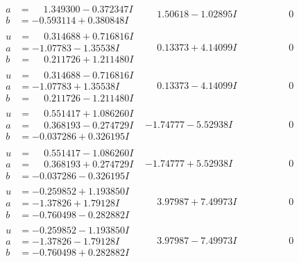 \documentclass[1p]{elsarticle_modified}
\theoremstyle{definition}
\begin{document}
$$\begin{array}{c|c|c}
\begin{aligned}
a &= \phantom{-}1.349300 - 0.372347 I \\
b &= -0.593114 + 0.380848 I\end{aligned}
 & \phantom{-}1.50618 - 1.02895 I & \phantom{-0.000000 } 0 \\ \hline\begin{aligned}
u &= \phantom{-}0.314688 + 0.716816 I \\
a &= -1.07783 - 1.35538 I \\
b &= \phantom{-}0.211726 + 1.211480 I\end{aligned}
 & \phantom{-}0.13373 + 4.14099 I & \phantom{-0.000000 } 0 \\ \hline\begin{aligned}
u &= \phantom{-}0.314688 - 0.716816 I \\
a &= -1.07783 + 1.35538 I \\
b &= \phantom{-}0.211726 - 1.211480 I\end{aligned}
 & \phantom{-}0.13373 - 4.14099 I & \phantom{-0.000000 } 0 \\ \hline\begin{aligned}
u &= \phantom{-}0.551417 + 1.086260 I \\
a &= \phantom{-}0.368193 - 0.274729 I \\
b &= -0.037286 + 0.326195 I\end{aligned}
 & -1.74777 - 5.52938 I & \phantom{-0.000000 } 0 \\ \hline\begin{aligned}
u &= \phantom{-}0.551417 - 1.086260 I \\
a &= \phantom{-}0.368193 + 0.274729 I \\
b &= -0.037286 - 0.326195 I\end{aligned}
 & -1.74777 + 5.52938 I & \phantom{-0.000000 } 0 \\ \hline\begin{aligned}
u &= -0.259852 + 1.193850 I \\
a &= -1.37826 + 1.79128 I \\
b &= -0.760498 - 0.282882 I\end{aligned}
 & \phantom{-}3.97987 + 7.49973 I & \phantom{-0.000000 } 0 \\ \hline\begin{aligned}
u &= -0.259852 - 1.193850 I \\
a &= -1.37826 - 1.79128 I \\
b &= -0.760498 + 0.282882 I\end{aligned}
 & \phantom{-}3.97987 - 7.49973 I & \phantom{-0.000000 } 0\\

\end{array}$$
\end{document}
